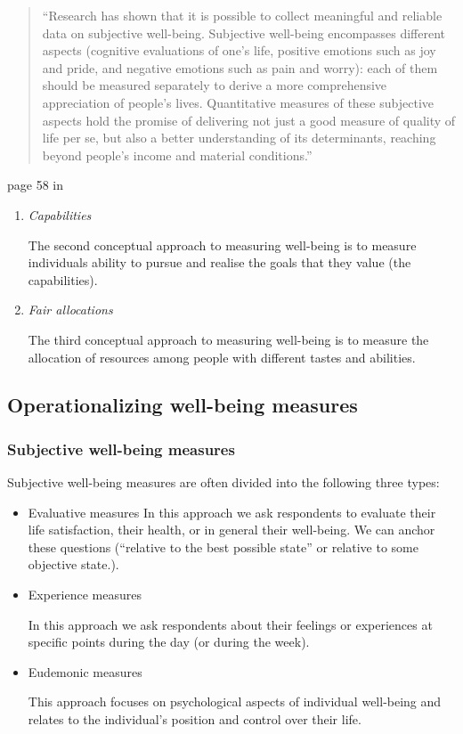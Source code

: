 \documentclass[]{book}
\begin{document}
\begin{quote}
``Research has shown that it is possible to collect meaningful and reliable data on
subjective well-being. Subjective well-being encompasses different aspects (cognitive
evaluations of one's life, positive emotions such as joy and pride, and negative emotions such as pain and worry): each of them should be measured separately to derive a more comprehensive appreciation of people's lives. Quantitative measures of these subjective aspects hold the promise of delivering not just a good measure of quality of life per se, but also a better understanding of its determinants, reaching beyond people's income and material conditions.''
\end{quote}

page 58 in \citep{stiglitz2010report}

\begin{enumerate}
\def\labelenumi{\arabic{enumi}.}
\setcounter{enumi}{1}
\item
  \emph{Capabilities}

  The second conceptual approach to measuring well-being is to measure individuals ability to pursue and realise the goals that they value (the capabilities).
\item
  \emph{Fair allocations}

  The third conceptual approach to measuring well-being is to measure the allocation of resources among people with different tastes and abilities.
\end{enumerate}

\hypertarget{operationalizing-well-being-measures}{%
\subsection{Operationalizing well-being measures}\label{operationalizing-well-being-measures}}

\hypertarget{subjective-well-being-measures}{%
\subsubsection{Subjective well-being measures}\label{subjective-well-being-measures}}

Subjective well-being measures are often divided into the following three types:

\begin{itemize}
\item
  Evaluative measures
  In this approach we ask respondents to evaluate their life satisfaction, their health, or in general their well-being. We can anchor these questions (``relative to the best possible state'' or relative to some objective state.).
\item
  Experience measures

  In this approach we ask respondents about their feelings or experiences at specific points during the day (or during the week).
\item
  Eudemonic measures

  This approach focuses on psychological aspects of individual well-being and relates to the individual's position and control over their life.
\end{itemize}
\end{document}
